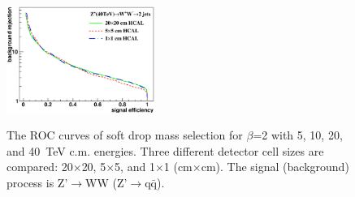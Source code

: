 \begin{figure}
\begin{center}
{ \includegraphics[width=0.43\textwidth]{figs/A_Cluster_mass_sdb2_40tev_eff_1_central_fix_at_Median_bin_ww_qq_log_no_UOF.eps}
 }
\end{center}
\caption{
The ROC curves of soft drop mass selection for $\beta$=2
with 5, 10, 20, and 40~TeV c.m. energies. 
Three different detector cell sizes are compared: 20$\times$20, 
5$\times$5, and 1$\times$1 (cm$\times$cm). 
The signal (background) process is Z'$\rightarrow$WW 
(Z'$\rightarrow$q$\bar{\mathrm{q}}$).
}
\label{fig:cluster_mass_sdb2_ww_ROC}
\end{figure}


